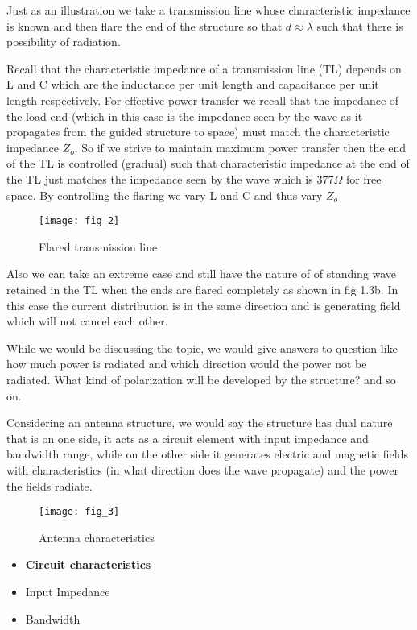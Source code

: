 Just as an illustration we take a transmission line whose characteristic impedance is known and then flare the end of the structure so that $d\approx\lambda$ such that there is possibility of radiation.

Recall that the characteristic impedance of a transmission line (TL) depends on L and C which are the inductance per unit length and capacitance per unit length respectively. For effective power transfer we recall that the impedance of the load end (which in this case is the impedance seen by the wave as it propagates from the guided structure to space) must match the characteristic impedance $Z_o$. So if we strive to maintain maximum power transfer then the end of the TL is controlled (gradual) such that characteristic impedance at the end of the TL just matches the impedance seen by the wave which is 377$\Omega$ for free space.
By controlling the flaring we vary L and C and thus vary $Z_o$
\begin{figure}
	\centering
	\texttt{[image: fig\_2]}
	\caption{Flared transmission line}
\end{figure}
Also we can take an extreme case and still have the nature of of standing wave retained in the TL when the ends are flared completely as shown in fig 1.3b. In this case the current distribution is in the same direction and is generating field which will not cancel each other.

While we would be discussing the topic, we would give answers to question like how much power is radiated and which direction would the power not be radiated. What kind of polarization will be developed by the structure? and so on.

Considering an antenna structure, we would say the structure has dual nature that is on one side, it acts as a circuit element with input impedance and bandwidth range, while on the other side it generates electric and magnetic fields with characteristics (in what direction does the wave propagate) and the power the fields radiate.
\begin{figure}
	\centering
	\texttt{[image: fig\_3]}
	\caption{Antenna characteristics}
\end{figure}

\begin{itemize}
	\item \textbf{Circuit characteristics}
	\item Input Impedance
	\item Bandwidth
\end{itemize}


